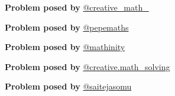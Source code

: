 \documentclass[12pt]{article}
\begin{document}
\begin{flushright}
\textbf{Problem posed by}
\textcolor{RoyalBlue2}{\href{https://www.instagram.com/creative_math_/}{@creative\_math\_}}
\end{flushright}

\begin{flushright}
\textbf{Problem posed by}
\textcolor{RoyalBlue2}{\href{https://www.instagram.com/pepemaths/}{@pepemaths}}
\end{flushright}

\begin{flushright}
\textbf{Problem posed by}
\textcolor{RoyalBlue2}{\href{https://www.instagram.com/mathinity/}{@mathinity}}
\end{flushright}


\begin{flushright}
\textbf{Problem posed by} 
\textcolor{RoyalBlue2}{\href{https://www.instagram.com/creative.math_solving/}{@creative.math\_solving}}
\end{flushright}

\begin{flushright}
\textbf{Problem posed by}
\textcolor{RoyalBlue2}{\href{https://www.instagram.com/saitejasomu/}{@saitejasomu}}
\end{flushright}
\end{document}
